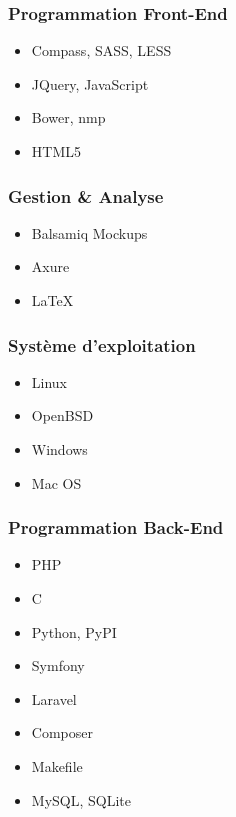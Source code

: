 \documentclass{resume}
\begin{document}
\begin{multicols}{2}
{\begin{multicols}{2}
			\subsubsection*{Programmation Front-End}
			\begin{itemize}
				\scriptsize
				\item Compass, SASS, LESS
				\item JQuery, JavaScript
				\item Bower, nmp
				\item HTML5
			\end{itemize}

			\subsubsection*{Gestion \& Analyse}
			\begin{itemize}
				\scriptsize
				\item Balsamiq Mockups
				\item Axure
				\item LaTeX
			\end{itemize}

			\subsubsection*{Système d'exploitation}
			\begin{itemize}
				\scriptsize
				\item Linux
				\item OpenBSD
				\item Windows
				\item Mac OS
			\end{itemize}

			\columnbreak

			\subsubsection*{Programmation Back-End}
			\begin{itemize}
				\scriptsize
				\item PHP
				\item C
				\item Python, PyPI
				\item Symfony
				\item Laravel
				\item Composer
				\item Makefile
				\item MySQL, SQLite
			\end{itemize}


\end{multicols}}
\end{multicols}
\end{document}
